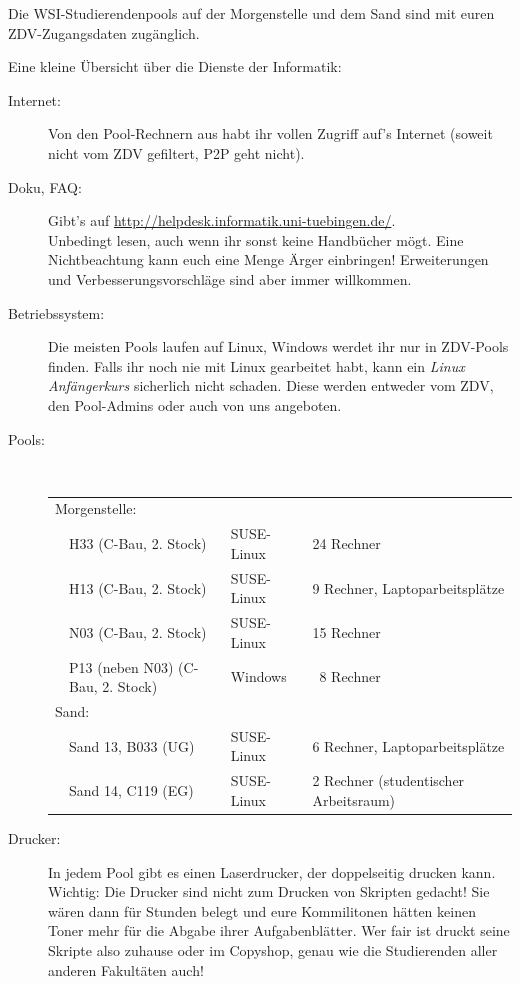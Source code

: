 
Die WSI-Studierendenpools auf der Morgenstelle und dem Sand sind
  mit euren ZDV-Zugangsdaten zugänglich.

Eine kleine Übersicht über die Dienste der Informatik:

\begin{description}

  \item[Internet:]
    Von den Pool-Rechnern aus habt ihr vollen Zugriff auf's Internet (soweit
    nicht vom ZDV gefiltert, P2P geht nicht).

  \item[Doku, FAQ:]
    Gibt's auf \url{http://helpdesk.informatik.uni-tuebingen.de/}.\\
    Unbedingt lesen, auch wenn ihr sonst keine Handbücher mögt. Eine
    Nichtbeachtung kann euch eine Menge Ärger einbringen! Erweiterungen und
    Ver\-bes\-ser\-ungs\-vor\-schläge sind aber immer willkommen.

  \item[Betriebssystem:]
    Die meisten Pools laufen auf Linux, Windows werdet ihr nur in ZDV-Pools finden. Falls ihr noch nie mit Linux gearbeitet habt, 
    kann ein \textit{Linux Anfängerkurs} sicherlich nicht schaden. Diese werden entweder vom ZDV, den Pool-Admins oder auch von uns angeboten.

  \item[Pools:] ~\\
    \begin{tabular}{llll}
    \multicolumn{3}{l}{Morgenstelle:} \\
    & H33 (C-Bau, 2. Stock) &  SUSE-Linux & 24 Rechner\\
    & H13 (C-Bau, 2. Stock) &  SUSE-Linux & 9 Rechner, Laptoparbeitsplätze\\
    & N03 (C-Bau, 2. Stock) &  SUSE-Linux & 15 Rechner\\
    & P13 (neben N03) (C-Bau, 2. Stock) &  Windows & ~8 Rechner\\

    \multicolumn{3}{l}{Sand:} \\
    &  Sand 13, B033 (UG) & SUSE-Linux & 6 Rechner, Laptoparbeitsplätze\\
    &  Sand 14, C119 (EG) & SUSE-Linux & 2 Rechner (studentischer Arbeitsraum)
    \end{tabular}

  \item[Drucker:]
     In jedem Pool gibt es einen Laserdrucker, der doppelseitig drucken kann.
     Wichtig: Die Drucker sind nicht zum Drucken
     von Skripten gedacht! Sie wären dann für Stunden belegt und eure
     Kommilitonen hätten keinen Toner mehr für die Abgabe ihrer Aufgabenblätter.
     Wer fair ist druckt seine Skripte also zuhause oder im Copyshop, genau wie
     die Studierenden aller anderen Fakultäten auch!


\end{description}
